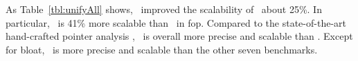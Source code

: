 As Table~\ref{tbl:unifyAll} shows, \ourtool~improved the scalability of \callSL~about 25\%. In particular, \callSLG~is 41\% more scalable than \callSL~in fop. Compared to the state-of-the-art hand-crafted pointer analysis \BatonUnity, \callSLG~is overall more precise and scalable than \BatonUnity. Except for bloat, \callSLG~is more precise and scalable than the other seven benchmarks.






